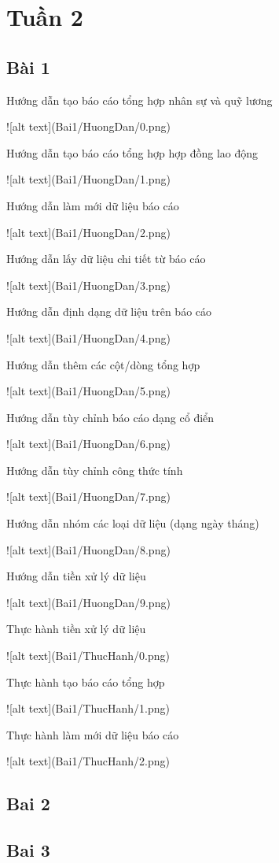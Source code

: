 \documentclass{article}
\begin{document}
\tableofcontents
\newpage
\listoffigures
\newpage
\section{Tuần 2}
\subsection{Bài 1}  

\caption{Hướng dẫn tạo báo cáo tổng hợp nhân sự và quỹ lương}
![alt text](Bai1/HuongDan/0.png)
\caption{Hướng dẫn tạo báo cáo tổng hợp hợp đồng lao động}
![alt text](Bai1/HuongDan/1.png)
\caption{Hướng dẫn làm mới dữ liệu báo cáo}
![alt text](Bai1/HuongDan/2.png)
\caption{Hướng dẫn lấy dữ liệu chi tiết từ báo cáo}
![alt text](Bai1/HuongDan/3.png)
\caption{Hướng dẫn định dạng dữ liệu trên báo cáo}
![alt text](Bai1/HuongDan/4.png)
\caption{Hướng dẫn thêm các cột/dòng tổng hợp}
![alt text](Bai1/HuongDan/5.png)
\caption{Hướng dẫn tùy chỉnh báo cáo dạng cổ điển}
![alt text](Bai1/HuongDan/6.png)
\caption{Hướng dẫn tùy chỉnh công thức tính}
![alt text](Bai1/HuongDan/7.png)
\caption{Hướng dẫn nhóm các loại dữ liệu (dạng ngày tháng)}
![alt text](Bai1/HuongDan/8.png)
\caption{Hướng dẫn tiền xử lý dữ liệu}
![alt text](Bai1/HuongDan/9.png)

\caption{Thực hành tiền xử lý dữ liệu}
![alt text](Bai1/ThucHanh/0.png)
\caption{Thực hành tạo báo cáo tổng hợp}
![alt text](Bai1/ThucHanh/1.png)
\caption{Thực hành làm mới dữ liệu báo cáo}
![alt text](Bai1/ThucHanh/2.png)
\subsection{Bai 2}

\subsection{Bai 3}

\end{document}
